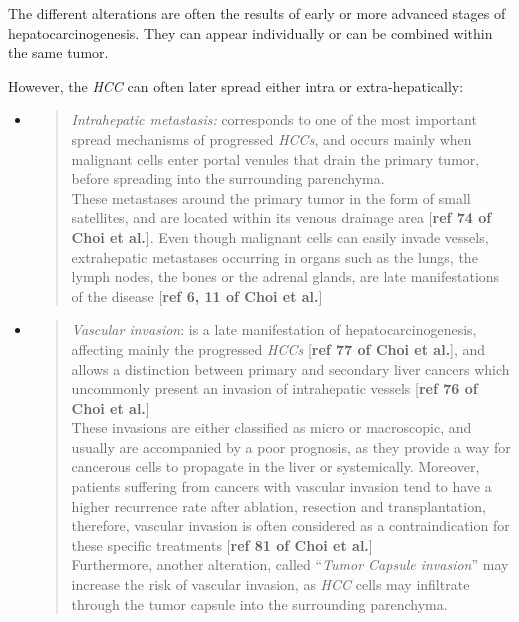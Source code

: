\documentclass[]{article}
\begin{document}
The different alterations are often the results of early or more
advanced stages of hepatocarcinogenesis. They can appear individually or
can be combined within the same tumor.

However, the \emph{HCC} can often later spread either intra or
extra-hepatically:

\begin{itemize}
\item
  \begin{quote}
  \emph{Intrahepatic metastasis:} corresponds to one of the most
  important spread mechanisms of progressed \emph{HCCs}, and occurs
  mainly when malignant cells enter portal venules that drain the
  primary tumor, before spreading into the surrounding parenchyma.\\
  These metastases around the primary tumor in the form of small
  satellites, and are located within its venous drainage area
  {[}\textbf{ref 74 of Choi et al.}{]}. Even though malignant cells can
  easily invade vessels, extrahepatic metastases occurring in organs
  such as the lungs, the lymph nodes, the bones or the adrenal glands,
  are late manifestations of the disease {[}\textbf{ref 6, 11 of Choi et
  al.}{]}
  \end{quote}
\item
  \begin{quote}
  \emph{Vascular invasion}: is a late manifestation of
  hepatocarcinogenesis, affecting mainly the progressed \emph{HCCs}
  {[}\textbf{ref 77 of Choi et al.}{]}, and allows a distinction between
  primary and secondary liver cancers which uncommonly present an
  invasion of intrahepatic vessels {[}\textbf{ref 76 of Choi et
  al.}{]}\\
  These invasions are either classified as micro or macroscopic, and
  usually are accompanied by a poor prognosis, as they provide a way for
  cancerous cells to propagate in the liver or systemically. Moreover,
  patients suffering from cancers with vascular invasion tend to have a
  higher recurrence rate after ablation, resection and transplantation,
  therefore, vascular invasion is often considered as a contraindication
  for these specific treatments {[}\textbf{ref 81 of Choi et al.}{]}\\
  Furthermore, another alteration, called ``\emph{Tumor Capsule
  invasion}'' may increase the risk of vascular invasion, as \emph{HCC}
  cells may infiltrate through the tumor capsule into the surrounding
  parenchyma.
  \end{quote}
\end{itemize}
\end{document}
